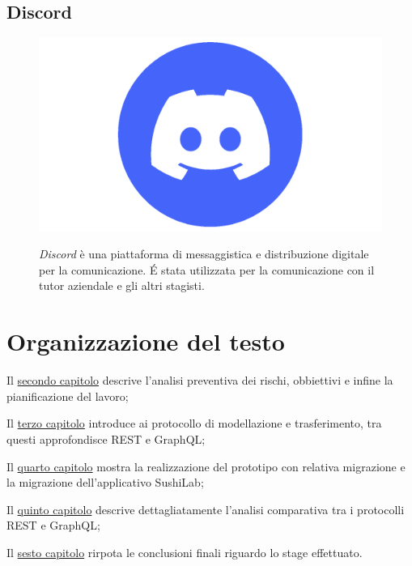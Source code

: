 \subsection*{Discord}
\FloatBarrier
\begin{figure}[!h]
  \begin{minipage}[h]{0.3\linewidth}
    \centering
    \includegraphics[width=0.7\linewidth]{immagini/discord.png}
  \end{minipage}
  \begin{minipage}[!h]{0.7\linewidth}
    \textit{Discord} è una piattaforma di messaggistica e distribuzione digitale per la comunicazione. É stata utilizzata per la comunicazione con il tutor aziendale e gli altri stagisti.
  \end{minipage}
\end{figure}
\FloatBarrier
\newpage
\section{Organizzazione del testo}
\begin{description}
    \item Il {\hyperref[descrizione-stage]{secondo capitolo}} descrive l'analisi preventiva dei rischi, obbiettivi e infine la pianificazione del lavoro;

    \item Il {\hyperref[protocolli-trasmissione-dati]{terzo capitolo}} introduce ai protocollo di modellazione e trasferimento, tra questi approfondisce REST e GraphQL;

    \item Il {\hyperref[casi-uso]{quarto capitolo}} mostra la realizzazione del prototipo con relativa migrazione e la migrazione dell'applicativo SushiLab;

    \item Il {\hyperref[analisi-comparativa]{quinto capitolo}} descrive dettagliatamente l'analisi comparativa tra i protocolli REST e GraphQL;

    \item Il {\hyperref[conclusioni]{sesto capitolo}} rirpota le conclusioni finali riguardo lo stage effettuato.
\end{description}

